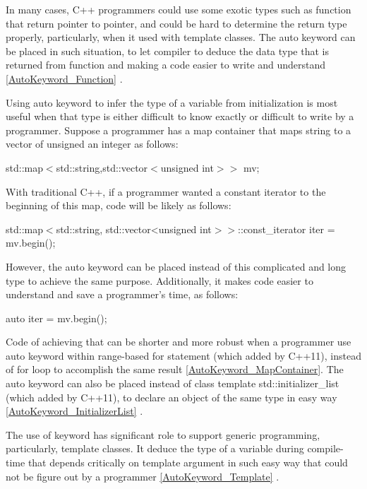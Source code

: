 \documentclass[11pt]{report}
\begin{document}
In many cases, C++ programmers could use some exotic types such as function that return pointer to pointer, and could be hard to determine the return type properly, particularly, when it used with template classes. The auto keyword can be placed in such situation, to let compiler to deduce the data type that is returned from function and making a code easier to write and understand \ref{AutoKeyword_Function} \cite{Overland:2011:CWF}.


Using auto keyword to infer the type of a variable from initialization is most useful when that type is either difficult to know exactly or difficult to write by a programmer. Suppose a programmer has a map container that maps string to a vector of unsigned an integer as follows: 

\begin{center}
std::map$<$std::string,std::vector$<$unsigned int$>>$ mv;
\end{center}

With traditional C++, if a programmer wanted a constant iterator to the beginning of this map, code will be likely as follows:

\begin{center}
std::map$<$std::string, std::vector<unsigned int$>>$::const\_iterator iter = mv.begin();
\end{center}

However, the auto keyword can be placed instead of this complicated and long type to achieve the same purpose. Additionally, it makes code easier to understand and save a programmer's time, as follows:

\begin{center}
auto iter = mv.begin();
\end{center}

Code of achieving that can be shorter and more robust when a programmer use auto keyword within range-based for statement (which added by C++11), instead of for loop to accomplish the same result \ref{AutoKeyword_MapContainer}. The auto keyword can also be placed instead of class template std::initializer\_list (which added by C++11), to declare an object of the same type in easy way \ref{AutoKeyword_InitializerList} \cite{Gregorie:professionalcpp}.


The use of keyword has significant role to support generic programming, particularly, template classes. It deduce the type of a variable  during compile- time that depends critically on template argument in such easy way that could not be figure out by a programmer \ref{AutoKeyword_Template} \cite{Stroustrup:2012:Cpp11}.
\end{document}
